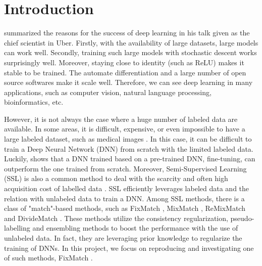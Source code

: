 \section{Introduction} \label{sec:intro}
\citet{zoubin2020} summarized the reasons for the success of deep learning in his talk given as the chief scientist in Uber. Firstly, with the availability of large datasets, large models can work well. Secondly, training such large models with stochastic descent works surprisingly well. Moreover, staying close to identity (such as ReLU) makes it stable to be trained. The automate differentiation and a large number of open source softwares make it scale well. Therefore, we can see deep learning in many applications, such as computer vision, natural language processing, bioinformatics, etc. 

However, it is not always the case where a huge number of labeled data are available. In some areas, it is difficult, expensive, or even impossible to have a large labeled dataset, such as medical images \citep{kuznetsova2018open}. In this case, it can be difficult to train a Deep Neural Network (DNN) from scratch with the limited labeled data. Luckily, \citet{tajbakhsh2016convolutional} shows that a DNN trained based on a pre-trained DNN, fine-tuning, can outperform the one trained from scratch. Moreover, Semi-Supervised Learning (SSL) is also a common method to deal with the scarcity and often high acquisition cost of labelled data \citep{pmlr-v124-kugelgen20a}. SSL efficiently leverages labeled data and the relation with unlabeled data to train a DNN.
Among SSL methods, there is a class of "match"-based methods,
such as FixMatch \citep{sohn2020fixmatch}, MixMatch \citep{berthelot2019mixmatch}, ReMixMatch \citep{kurakin2020remixmatch} and DivideMatch \citep{li2020dividemix}. These methods utilize the consistency regularization, pseudo-labelling and ensembling methods to boost the performance with the use of unlabeled data. In fact, they are leveraging prior knowledge to regularize the training of DNNs.
In this project, we focus on reproducing and investigating one of such methods, FixMatch \citep{sohn2020fixmatch}.

